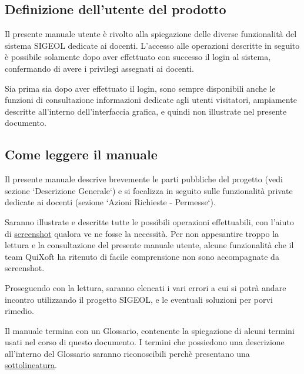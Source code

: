 \documentclass[11pt,a4paper]{article}
\begin{document}
\subsection{Definizione dell'utente del prodotto}
Il presente manuale utente è rivolto alla spiegazione delle diverse funzionalità del sistema SIGEOL dedicate ai docenti.
L'accesso alle operazioni descritte in seguito è possibile solamente dopo aver effettuato con successo il login al sistema, confermando di avere i privilegi assegnati ai docenti.

Sia prima sia dopo aver effettuato il login, sono sempre disponibili anche le funzioni di consultazione informazioni dedicate agli utenti visitatori, ampiamente descritte all'interno dell'interfaccia grafica, e quindi non illustrate nel presente documento.
\subsection{Come leggere il manuale}
Il presente manuale descrive brevemente le parti pubbliche del progetto (vedi sezione `Descrizione Generale`) e si focalizza in seguito sulle funzionalità private dedicate ai docenti (sezione `Azioni Richieste - Permesse`).

Saranno illustrate e descritte tutte le possibili operazioni effettuabili, con l'aiuto di \underline{screenshot} qualora ve ne fosse la necessità.
Per non appesantire troppo la lettura e la consultazione del presente manuale utente, alcune funzionalità che il team QuiXoft ha ritenuto di facile comprensione non sono accompagnate da screenshot.

Proseguendo con la lettura, saranno elencati i vari errori a cui si potrà andare incontro utilizzando il progetto SIGEOL, e le eventuali soluzioni per porvi rimedio.

Il manuale termina con un Glossario, contenente la spiegazione di alcuni termini usati nel corso di questo documento.
I termini che possiedono una descrizione all'interno del Glossario saranno riconoscibili perchè presentano una \underline{sottolineatura}.
\end{document}
